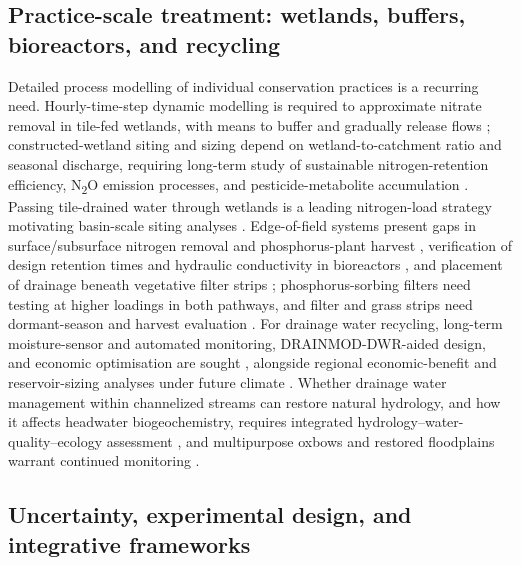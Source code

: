 \subsection{Practice-scale treatment: wetlands, buffers, bioreactors, and recycling}

Detailed process modelling of individual conservation practices is a recurring
need. Hourly-time-step dynamic modelling is required to approximate nitrate removal
in tile-fed wetlands, with means to buffer and gradually release flows
\parencite{Tanner2011}; constructed-wetland siting and sizing depend on
wetland-to-catchment ratio and seasonal discharge, requiring long-term study of
sustainable nitrogen-retention efficiency, N\textsubscript{2}O emission processes,
and pesticide-metabolite accumulation
\parencite{Steidl2019,Tournebize2017,Kovacic2006,Haverstock2017}. Passing
tile-drained water through wetlands is a leading nitrogen-load strategy motivating
basin-scale siting analyses \parencite{Baeumler2020,Billy2013,Madramootoo2007,Kadlec2012}.
Edge-of-field systems present gaps in surface/subsurface nitrogen removal and
phosphorus-plant harvest \parencite{Gordon2021}, verification of design retention
times and hydraulic conductivity in bioreactors \parencite{Feyereisen2015}, and
placement of drainage beneath vegetative filter strips \parencite{Bhattarai2009};
phosphorus-sorbing filters need testing at higher loadings in both pathways, and
filter and grass strips need dormant-season and harvest evaluation
\parencite{Plach2023,Holly2016,Vallée2015}. For drainage water recycling,
long-term moisture-sensor and automated monitoring, DRAINMOD-DWR-aided design,
and economic optimisation are sought \parencite{Kaur2021,Moursi2024,Hay2021,Willison2021},
alongside regional economic-benefit and reservoir-sizing analyses under future
climate \parencite{Kosari2024,Li2021b}. Whether drainage water management within
channelized streams can restore natural hydrology, and how it affects headwater
biogeochemistry, requires integrated hydrology--water-quality--ecology assessment
\parencite{King2009,Sunohara2015,Dalzell2018}, and multipurpose oxbows and
restored floodplains warrant continued monitoring
\parencite{Leberg2024,Schilling2017,ElAgha2020,AbdelDayem2007}.

\subsection{Uncertainty, experimental design, and integrative frameworks}

